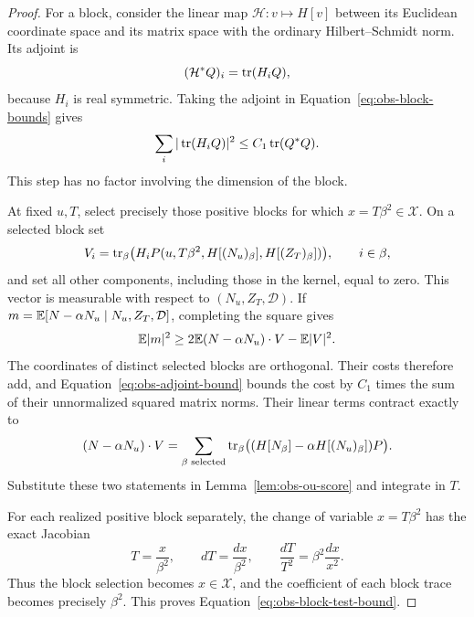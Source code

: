 \begin{proof}
For a block, consider the linear map
$\mathcal H:v\mapsto H[v]$ between its Euclidean coordinate space
and its matrix space with the ordinary Hilbert--Schmidt norm.
Its adjoint is
\[
 (\mathcal H^*Q)_i=\operatorname{tr}(H_iQ),
\]
because $H_i$ is real symmetric.  Taking the adjoint in
Equation~\eqref{eq:obs-block-bounds} gives
\begin{equation}\label{eq:obs-adjoint-bound}
 \sum_i|\operatorname{tr}(H_iQ)|^2\le C_1\operatorname{tr}(Q^*Q).
\end{equation}
This step has no factor involving the dimension of the block.

At fixed $u,T$, select precisely those positive blocks for which
$x=T\beta^2\in\mathcal X$.  On a selected block set
\[
 V_i=\operatorname{tr}_\beta
 \bigl(H_iP(u,T\beta^2,H[(N_u)_\beta],H[(Z_T)_\beta])\bigr),
 \qquad i\in\beta,
\]
and set all other components, including those in the kernel, equal
to zero.  This vector is measurable with respect to
$(N_u,Z_T,\mathcal D)$.  If
$m=\mathbb E[N-\alpha N_u\mid N_u,Z_T,\mathcal D]$, completing the square
gives
\[
 \mathbb E|m|^2\ge2\mathbb E(N-\alpha N_u)\cdot V-\mathbb E|V|^2.
\]
The coordinates of distinct selected blocks are orthogonal.  Their
costs therefore add, and Equation~\eqref{eq:obs-adjoint-bound} bounds
the cost by $C_1$ times the sum of their unnormalized squared matrix
norms.  Their linear terms contract exactly to
\[
 (N-\alpha N_u)\cdot V
 =\sum_{\beta\text{ selected}}\operatorname{tr}_\beta
 \bigl((H[N_\beta]-\alpha H[(N_u)_\beta])P\bigr).
\]
Substitute these two statements in
Lemma~\ref{lem:obs-ou-score} and integrate in $T$.

For each realized positive block separately, the change of variable
$x=T\beta^2$ has the exact Jacobian
\begin{equation}\label{eq:obs-scale-jacobian}
 T=\frac{x}{\beta^2},\qquad dT=\frac{dx}{\beta^2},\qquad
 \boxed{\displaystyle\frac{dT}{T^2}=\beta^2\frac{dx}{x^2}}.
\end{equation}
Thus the block selection becomes $x\in\mathcal X$, and the
coefficient of each block trace becomes precisely $\beta^2$.
This proves Equation~\eqref{eq:obs-block-test-bound}.


\end{proof}
